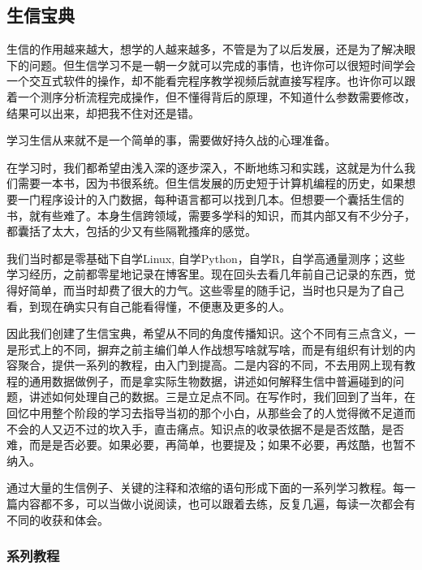 \documentclass[]{article}
\numberwithin{figure}{section}
\numberwithin{table}{section}
\begin{document}
\hypertarget{ux751fux4fe1ux5b9dux5178}{%
\subsection{生信宝典}\label{ux751fux4fe1ux5b9dux5178}}

生信的作用越来越大，想学的人越来越多，不管是为了以后发展，还是为了解决眼下的问题。但生信学习不是一朝一夕就可以完成的事情，也许你可以很短时间学会一个交互式软件的操作，却不能看完程序教学视频后就直接写程序。也许你可以跟着一个测序分析流程完成操作，但不懂得背后的原理，不知道什么参数需要修改，结果可以出来，却把我不住对还是错。

学习生信从来就不是一个简单的事，需要做好持久战的心理准备。

在学习时，我们都希望由浅入深的逐步深入，不断地练习和实践，这就是为什么我们需要一本书，因为书很系统。但生信发展的历史短于计算机编程的历史，如果想要一门程序设计的入门数据，每种语言都可以找到几本。但想要一个囊括生信的书，就有些难了。本身生信跨领域，需要多学科的知识，而其内部又有不少分子，都囊括了太大，包括的少又有些隔靴搔痒的感觉。

我们当时都是零基础下自学Linux, 自学Python，自学R，自学高通量测序；这些学习经历，之前都零星地记录在博客里。现在回头去看几年前自己记录的东西，觉得好简单，而当时却费了很大的力气。这些零星的随手记，当时也只是为了自己看，到现在确实只有自己能看得懂，不便惠及更多的人。

因此我们创建了生信宝典，希望从不同的角度传播知识。这个不同有三点含义，一是形式上的不同，摒弃之前主编们单人作战想写啥就写啥，而是有组织有计划的内容聚合，提供一系列的教程，由入门到提高。二是内容的不同，不去用网上现有教程的通用数据做例子，而是拿实际生物数据，讲述如何解释生信中普遍碰到的问题，讲述如何处理自己的数据。三是立足点不同。在写作时，我们回到了当年，在回忆中用整个阶段的学习去指导当初的那个小白，从那些会了的人觉得微不足道而不会的人又迈不过的坎入手，直击痛点。知识点的收录依据不是是否炫酷，是否难，而是是否必要。如果必要，再简单，也要提及；如果不必要，再炫酷，也暂不纳入。

通过大量的生信例子、关键的注释和浓缩的语句形成下面的一系列学习教程。每一篇内容都不多，可以当做小说阅读，也可以跟着去练，反复几遍，每读一次都会有不同的收获和体会。

\hypertarget{ux7cfbux5217ux6559ux7a0b}{%
\subsubsection{系列教程}\label{ux7cfbux5217ux6559ux7a0b}}
\end{document}
